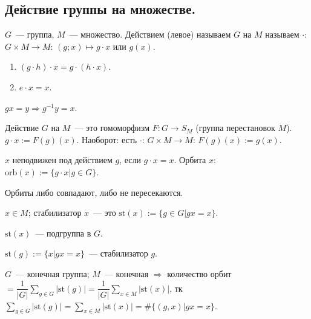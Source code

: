 \documentclass[12pt]{article}
\newcommand{\orb}{\text{orb}}
\newcommand{\st}[1]{\text{st}(#1)}
\begin{document}
	\subsection{Действие группы на множестве.}
	\begin{definition}
		$G$~--- группа, $M$~--- множество. Действием (левое) называем $G$ на $M$ называем $\cdot$: $G \times M \rightarrow M$: $(g; x) \mapsto g \cdot x$ или $g(x)$.
	\end{definition}
	\begin{property}
		\begin{enumerate}
			\item $(g \cdot h) \cdot x = g \cdot (h \cdot x)$.
			\item $e \cdot x = x$.
		\end{enumerate}
	\end{property}
	\begin{corollary}
		$gx = y \Rightarrow g^{-1}y = x$.
	\end{corollary}
	\begin{definition}[2]
		Действие $G$ на $M$~--- это гомоморфизм $F: G \rightarrow S_M$ (группа перестановок $M$). $g \cdot x := F(g)(x)$. Наоборот: есть $\cdot$: $G \times M \rightarrow M$: $F(g)(x) := g(x)$.
	\end{definition}
	\begin{definition}
		$x$ неподвижен под действием $g$, если $g \cdot x = x$. Орбита $x$: $\orb(x) := \{ g \cdot x | g \in G \}$.
	\end{definition}
	\begin{statement}
		Орбиты либо совпадают, либо не пересекаются.
	\end{statement}
	\begin{definition}
		$x \in M$; стабилизатор $x$~--- это $\st{x} := \{ g \in G | gx = x \}$.
	\end{definition}
	\begin{statement}
		$\st{x}$~--- подгруппа в $G$.
	\end{statement}
	\begin{definition}
		$\st{g} := \{ x | gx = x \}$~--- стабилизатор $g$.
	\end{definition}
	\begin{lemma}[Бермсайда]
		$G$~--- конечная группа; $M$~--- конечная $\Rightarrow$ количество орбит $= \dfrac{1}{|G|} \sum\limits_{g \in G} |\st{g}| = \dfrac{1}{|G|} \sum\limits_{x \in M} |\st{x}|$, тк $\sum\limits_{g \in G} |\st{g}| = \sum\limits_{x \in M} |\st{x}| = \# \{ (g, x) | gx = x \}$.
	\end{lemma}
	
\end{document}
